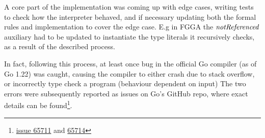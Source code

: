 A core part of the implementation was coming up with edge cases, writing tests
to check how the interpreter behaved, and if necessary updating both the formal
rules and implementation to cover the edge case. E.g in FGGA the $\mathit{notReferenced}$
auxiliary had to be updated to instantiate the type literals it recursively
checks, as a result of the described process.


In fact, following this process, at least once bug in the official Go compiler
(as of Go 1.22) was caught, causing the compiler to either crash due to stack
overflow, or incorrectly type check a program (behaviour dependent on input)
The two errors were subsequently reported as issues on Go's GitHub repo, where
exact details can be
found\footnote{\href{https://github.com/golang/go/issues/65711}{issue 65711} and
    \href{https://github.com/golang/go/issues/65714}{65714}}.



%
